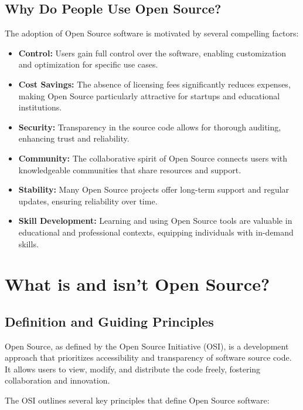 \cite{advantages-of-open-source-software}
\cite{Pros-and-cons-of-open-source-software}

\subsection{Why Do People Use Open Source?}

The adoption of Open Source software is motivated by several compelling factors:

\begin{itemize}
    \item \textbf{Control:} Users gain full control over the software, enabling customization and optimization for specific use cases.
    \item \textbf{Cost Savings:} The absence of licensing fees significantly reduces expenses, making Open Source particularly attractive for startups and educational institutions.
    \item \textbf{Security:} Transparency in the source code allows for thorough auditing, enhancing trust and reliability.
    \item \textbf{Community:} The collaborative spirit of Open Source connects users with knowledgeable communities that share resources and support.
    \item \textbf{Stability:} Many Open Source projects offer long-term support and regular updates, ensuring reliability over time.
    \item \textbf{Skill Development:} Learning and using Open Source tools are valuable in educational and professional contexts, equipping individuals with in-demand skills.
\end{itemize}


\section{What is and isn’t Open Source?}

\subsection{Definition and Guiding Principles}

Open Source, as defined by the Open Source Initiative (OSI), is a development approach that prioritizes accessibility and transparency of software source code. It allows users to view, modify, and distribute the code freely, fostering collaboration and innovation. 

The OSI outlines several key principles that define Open Source software:

